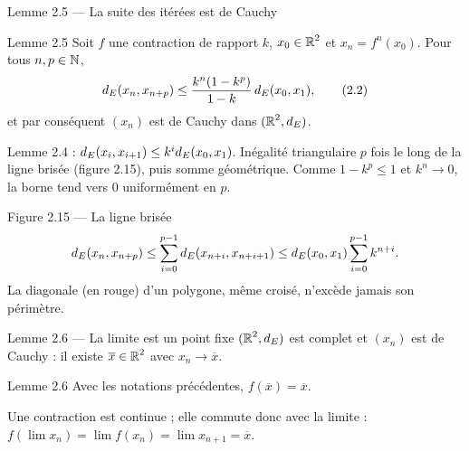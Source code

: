 \begin{frame}{Lemme 2.5 --- La suite des itérées est de Cauchy}
  \begin{Enonce}{Lemme 2.5}
    \small Soit $f$ une contraction de rapport $k$, $x_0\in\operatorname{\mathbb{R}}^2$ et
    $x_n=f^n(x_0)$. Pour tous $n,p\in\operatorname{\mathbb{N}}$,
    \[
      d_E(x_n,x_{n+p})\leq\frac{k^n(1-k^p)}{1-k}\,d_E(x_0,x_1),
      \tag{2.2}
    \]
    et par conséquent $(x_n)$ est de Cauchy dans $(\operatorname{\mathbb{R}}^2,d_E)$.
  \end{Enonce}
  \begin{AuTableau}
    \footnotesize Lemme 2.4 : $d_E(x_i,x_{i+1})\leq k^id_E(x_0,x_1)$.
    Inégalité triangulaire $p$ fois le long de la ligne brisée
    (figure 2.15), puis somme géométrique. Comme $1-k^p\leq1$ et
    $k^n\to0$, la borne tend vers $0$ uniformément en $p$.
  \end{AuTableau}
\end{frame}

\begin{frame}{Figure 2.15 --- La ligne brisée}
  \small
  \[
    d_E(x_n,x_{n+p}) \leq \sum_{i=0}^{p-1}d_E(x_{n+i},x_{n+i+1})
    \leq d_E(x_0,x_1)\sum_{i=0}^{p-1}k^{n+i}.
  \]
  La diagonale (en rouge) d'un polygone, même croisé, n'excède jamais
  son périmètre.
\end{frame}

\begin{frame}{Lemme 2.6 --- La limite est un point fixe}
  \small $(\operatorname{\mathbb{R}}^2,d_E)$ est complet et $(x_n)$ est de Cauchy : il existe
  $\overline{x}\in\operatorname{\mathbb{R}}^2$ avec $x_n\to\overline{x}$.
  \begin{Enonce}{Lemme 2.6}
    Avec les notations précédentes, $f(\overline{x})=\overline{x}$.
  \end{Enonce}
  \begin{AuTableau}
    \small Une contraction est continue ; elle commute donc avec la
    limite : $f(\lim x_n) = \lim f(x_n) = \lim x_{n+1} = \overline{x}$.
  \end{AuTableau}
\end{frame}

